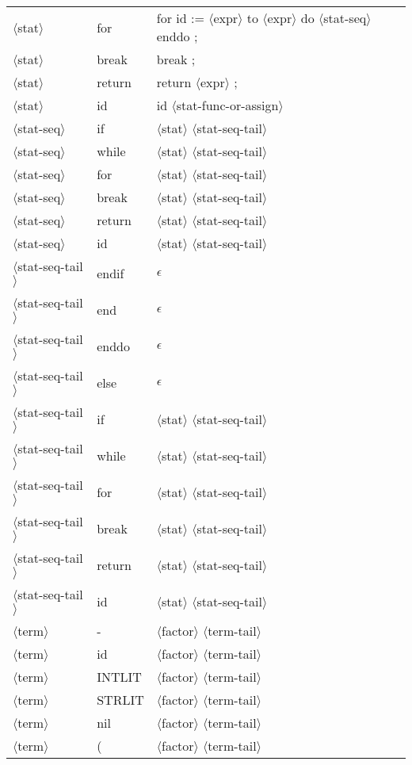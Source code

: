 \documentclass[11pt, fleqn]{article}
\newcommand{\atag}[1]{$\langle$#1$\rangle$}
\begin{document}
\begin{longtable}{l|l|l}
\atag{stat}						&	for		&	for id := \atag{expr} to \atag{expr} do \atag{stat-seq} enddo ;		\\
\atag{stat}						&	break	&	break ;			\\
\atag{stat}						&	return	&	return \atag{expr} ;		\\
\atag{stat}						&	id		&	id \atag{stat-func-or-assign}		\\
\atag{stat-seq}					&	if		&	\atag{stat} \atag{stat-seq-tail}		\\
\atag{stat-seq}					&	while	&	\atag{stat} \atag{stat-seq-tail}		\\
\atag{stat-seq}					&	for		&	\atag{stat} \atag{stat-seq-tail}		\\
\atag{stat-seq}					&	break	&	\atag{stat} \atag{stat-seq-tail}		\\
\atag{stat-seq}					&	return	&	\atag{stat} \atag{stat-seq-tail}		\\
\atag{stat-seq}					&	id		&	\atag{stat} \atag{stat-seq-tail}		\\
\atag{stat-seq-tail}				&	endif		&	$\epsilon$	\\
\atag{stat-seq-tail}				&	end			&	$\epsilon$	\\
\atag{stat-seq-tail}				&	enddo		&	$\epsilon$	\\
\atag{stat-seq-tail}				&	else			&	$\epsilon$	\\
\atag{stat-seq-tail}				&	if			&	\atag{stat} \atag{stat-seq-tail}	\\
\atag{stat-seq-tail}				&	while			&	\atag{stat} \atag{stat-seq-tail}	\\
\atag{stat-seq-tail}				&	for			&	\atag{stat} \atag{stat-seq-tail}	\\
\atag{stat-seq-tail}				&	break			&	\atag{stat} \atag{stat-seq-tail}	\\
\atag{stat-seq-tail}				&	return			&	\atag{stat} \atag{stat-seq-tail}	\\
\atag{stat-seq-tail}				&	id			&	\atag{stat} \atag{stat-seq-tail}	\\
\atag{term}				&	-		&	\atag{factor} \atag{term-tail}		\\
\atag{term}				&	id		&	\atag{factor} \atag{term-tail}		\\
\atag{term}				&	INTLIT	&	\atag{factor} \atag{term-tail}		\\
\atag{term}				&	STRLIT	&	\atag{factor} \atag{term-tail}		\\
\atag{term}				&	nil		&	\atag{factor} \atag{term-tail}		\\
\atag{term}				&	(		&	\atag{factor} \atag{term-tail}		\\

\end{longtable}
\end{document}
